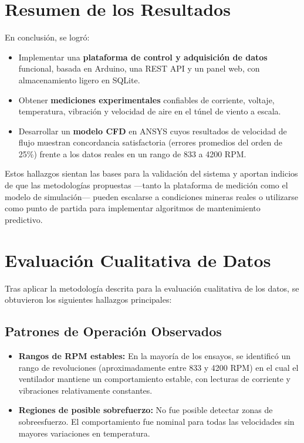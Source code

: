 \section{Resumen de los Resultados}
En conclusión, se logró:
\begin{itemize}
    \item Implementar una \textbf{plataforma de control y adquisición de datos} funcional, basada en Arduino, una REST API y un panel web, con almacenamiento ligero en SQLite.
    \item Obtener \textbf{mediciones experimentales} confiables de corriente, voltaje, temperatura, vibración y velocidad de aire en el túnel de viento a escala.
    \item Desarrollar un \textbf{modelo CFD} en ANSYS cuyos resultados de velocidad de flujo muestran concordancia satisfactoria (errores promedios del orden de 25\%) frente a los datos reales en un rango de 833 a 4200 RPM.
\end{itemize}

Estos hallazgos sientan las bases para la validación del sistema y aportan indicios de que las metodologías propuestas —tanto la plataforma de medición como el modelo de simulación— pueden escalarse a condiciones mineras reales o utilizarse como punto de partida para implementar algoritmos de mantenimiento predictivo.

\section{Evaluación Cualitativa de Datos}

Tras aplicar la metodología descrita para la evaluación cualitativa de los datos, se obtuvieron los siguientes hallazgos principales:

\subsection{Patrones de Operación Observados}
\begin{itemize}
    \item \textbf{Rangos de RPM estables:} En la mayoría de los ensayos, se identificó un rango de revoluciones (aproximadamente entre 833 y 4200 RPM) en el cual el ventilador mantiene un comportamiento estable, con lecturas de corriente y vibraciones relativamente constantes.
    \item \textbf{Regiones de posible sobrefuerzo:} No fue posible detectar zonas de sobreesfuerzo. El comportamiento fue nominal para todas las velocidades sin mayores variaciones en temperatura.
\end{itemize}

